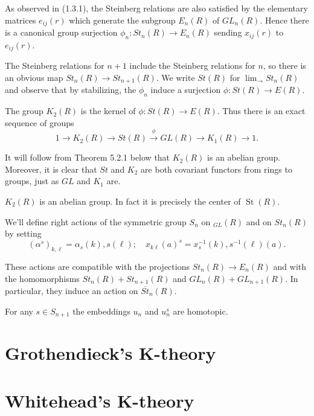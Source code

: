 As observed in (1.3.1), the Steinberg relations are also satisfied by the elementary matrices $e_{i j}(r)$ which generate the subgroup $E_n(R)$ of $G L_n(R)$. Hence there is a canonical group surjection $\phi_n: S t_n(R) \rightarrow E_n(R)$ sending $x_{i j}(r)$ to $e_{i j}(r)$.

The Steinberg relations for $n+1$ include the Steinberg relations for $n$, so there is an obvious map $S t_n(R) \rightarrow S t_{n+1}(R)$. We write $S t(R)$ for $\lim _{\longrightarrow} S t_n(R)$ and observe that by stabilizing, the $\phi_n$ induce a surjection $\phi: S t(R) \rightarrow E(R)$.


The group $K_2(R)$ is the kernel of $\phi: S t(R) \rightarrow E(R)$. Thus there is an exact sequence of groups
$$
1 \rightarrow K_2(R) \rightarrow S t(R) \xrightarrow{\phi} G L(R) \rightarrow K_1(R) \rightarrow 1 .
$$

It will follow from Theorem 5.2.1 below that $K_2(R)$ is an abelian group. Moreover, it is clear that $S t$ and $K_2$ are both covariant functors from rings to groups, just as $G L$ and $K_1$ are.

\begin{theo}
$K_2(R)$ is an abelian group. In fact it is precisely the center of $\operatorname{St}(R)$.
\end{theo}

We'll define right actions of the symmetric group $S_n$ on ${ }_{G L}(R)$ and on $S t_n(R)$ by setting
$$
\left(\alpha^s\right)_{k, \ell}=\alpha_s(k), s(\ell) ; \quad x_{k \ell}(a)^s=x_s^{-1}(k), s^{-1}(\ell)(a) .
$$

These actions are compatible with the projections $S t_n(R) \rightarrow E_n(R)$ and with the homomorphisms $S t_n(R)+S t_{n+1}(R)$ and $G L_n(R)+G L_{n+1}(R)$. In particular, they induce an action on $\overline{S t}_n(R)$.

\begin{lemm}
    For any $s \in S_{n+1}$ the embeddings $u_n$ and $u_n^s$ are homotopic.
\end{lemm} 




\chapter{Grothendieck's K-theory}





\chapter{Whitehead's K-theory}

